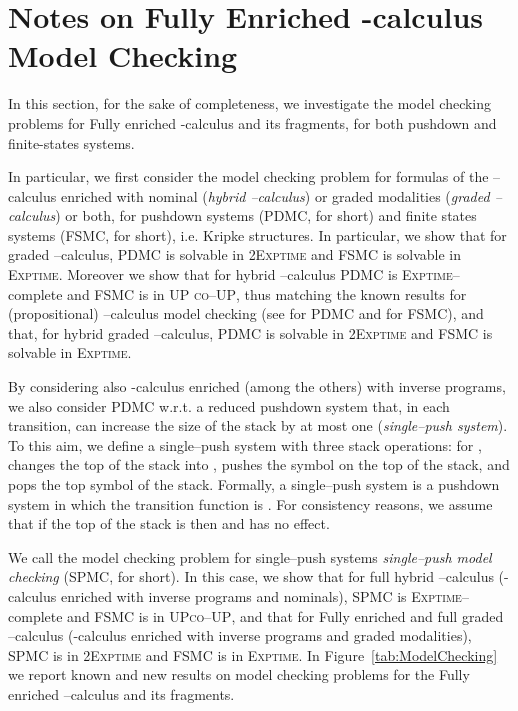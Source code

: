 \documentclass{LMCS}
\theoremstyle{plain}
\def \coUP          {\textsc{co--UP}\xspace}
\def \EXPTIME       {\textsc{Exptime}\xspace}
\def \FSMC          {\textsc{FSMC}\xspace}
\def \PDMC          {\textsc{PDMC}\xspace}
\def \SPMC          {\textsc{SPMC}\xspace}
\def \TWOEXPTIME    {\textsc{2Exptime}\xspace}
\def \UP            {{\sc UP}}
\def \UP            {\textsc{UP}\xspace}
\begin{document}
\section{Notes on Fully Enriched -calculus Model Checking}\label{sec:ModelChecking}
In this section, for the sake of completeness, we investigate the model
checking problems for Fully enriched -calculus and its fragments, for both
pushdown and finite-states systems.

In particular, we first consider the model checking problem for formulas of the
--calculus enriched with nominal (\emph{hybrid --calculus}) or graded
modalities (\emph{graded --calculus}) or both, for pushdown systems
(\PDMC, for short) and finite states systems (\FSMC, for short), i.e. Kripke
structures. In particular, we show that for graded --calculus, \PDMC is
solvable in \TWOEXPTIME and \FSMC is solvable in \EXPTIME. Moreover we show
that for hybrid --calculus \PDMC is \EXPTIME--complete and \FSMC is in \UP
 \coUP, thus matching the known results for (propositional)
--calculus model checking (see \cite{Wal96} for \PDMC and \cite{Wil01} for
\FSMC), and that, for hybrid graded --calculus, \PDMC is solvable in
\TWOEXPTIME and \FSMC is solvable in \EXPTIME.

By considering also -calculus enriched (among the others) with inverse
programs, we also consider \PDMC w.r.t. a reduced pushdown system that, in each
transition, can increase the size of the stack by at most one
(\emph{single--push system}). To this aim, we define a single--push system with
three stack operations: for ,  changes the top of the
stack into ,  pushes the symbol  on the top of the stack, and
 pops the top symbol of the stack. Formally, a single--push system 
is a pushdown system in which the transition function is . For consistency reasons, we assume that if the top of the stack is
 then  and  has no effect.

We call the model checking problem for single--push systems \emph{single--push
model checking} (\SPMC, for short). In this case, we show that for full hybrid
--calculus (-calculus enriched with inverse programs and nominals),
\SPMC is \EXPTIME--complete and \FSMC is in \UP  \coUP, and that for
Fully enriched and full graded --calculus (-calculus enriched with
inverse programs and graded modalities), \SPMC is in \TWOEXPTIME and \FSMC is
in \EXPTIME. In Figure~\ref{tab:ModelChecking} we report known and new results
on model checking problems for the Fully enriched --calculus and its
fragments.
\end{document}
